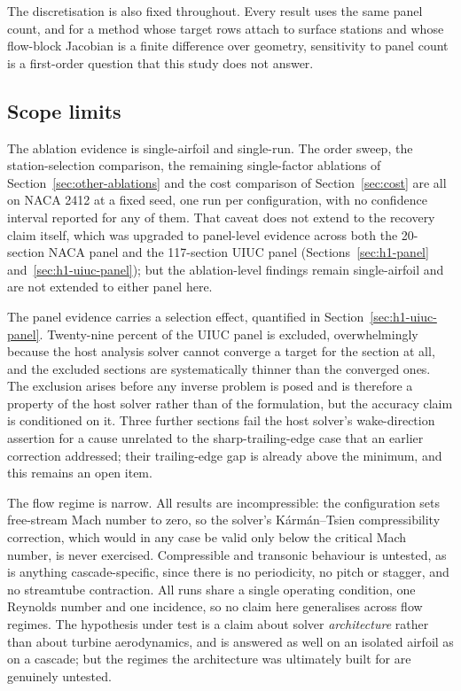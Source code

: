 The discretisation is also fixed throughout. Every result uses the same panel
count, and for a method whose target rows attach to surface stations and whose
flow-block Jacobian is a finite difference over geometry, sensitivity to panel
count is a first-order question that this study does not answer.

\subsection{Scope limits}
\label{sec:limitations}

The ablation evidence is single-airfoil and single-run. The order sweep, the
station-selection comparison, the remaining single-factor ablations of
Section~\ref{sec:other-ablations} and the cost comparison of
Section~\ref{sec:cost} are all on NACA 2412 at a fixed seed, one run per
configuration, with no confidence interval reported for any of them. That caveat does not extend to the recovery claim itself, which was
upgraded to panel-level evidence across both the 20-section NACA panel and the
117-section UIUC panel (Sections~\ref{sec:h1-panel}
and~\ref{sec:h1-uiuc-panel}); but the ablation-level findings remain
single-airfoil and are not extended to either panel here.

The panel evidence carries a selection effect, quantified in
Section~\ref{sec:h1-uiuc-panel}. Twenty-nine percent of the UIUC panel is
excluded, overwhelmingly because the host analysis solver cannot converge a
target for the section at all, and the excluded sections are systematically
thinner than the converged ones. The exclusion arises before any inverse
problem is posed and is therefore a property of the host solver rather than of
the formulation, but the accuracy claim is conditioned on it. Three further
sections fail the host solver's wake-direction assertion for a cause unrelated
to the sharp-trailing-edge case that an earlier correction addressed; their
trailing-edge gap is already above the minimum, and this remains an open item.

The flow regime is narrow. All results are incompressible: the configuration
sets free-stream Mach number to zero, so the solver's Kármán--Tsien
compressibility correction, which would in any case be valid only below the
critical Mach number, is never exercised. Compressible and transonic behaviour
is untested, as is anything cascade-specific, since there is no periodicity,
no pitch or stagger, and no streamtube contraction. All runs share a single
operating condition, one Reynolds number and one incidence, so no claim here
generalises across flow regimes. The hypothesis under test is a claim about
solver \emph{architecture} rather than about turbine aerodynamics, and is
answered as well on an isolated airfoil as on a cascade; but the regimes the
architecture was ultimately built for are genuinely untested.

